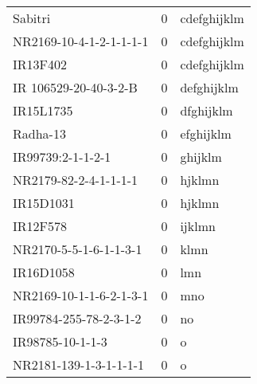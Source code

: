 \documentclass[]{article}
\begin{document}
\begin{longtable}{lll}
Sabitri & 0 & cdefghijklm\\
\rowcolor{gray!6}  NR2169-10-4-1-2-1-1-1-1 & 0 & cdefghijklm\\
IR13F402 & 0 & cdefghijklm\\
\addlinespace
\rowcolor{gray!6}  IR 106529-20-40-3-2-B & 0 & defghijklm\\
IR15L1735 & 0 & dfghijklm\\
\rowcolor{gray!6}  Radha-13 & 0 & efghijklm\\
IR99739:2-1-1-2-1 & 0 & ghijklm\\
\rowcolor{gray!6}  NR2179-82-2-4-1-1-1-1 & 0 & hjklmn\\
\addlinespace
IR15D1031 & 0 & hjklmn\\
\rowcolor{gray!6}  IR12F578 & 0 & ijklmn\\
NR2170-5-5-1-6-1-1-3-1 & 0 & klmn\\
\rowcolor{gray!6}  IR16D1058 & 0 & lmn\\
NR2169-10-1-1-6-2-1-3-1 & 0 & mno\\
\addlinespace
\rowcolor{gray!6}  IR99784-255-78-2-3-1-2 & 0 & no\\
IR98785-10-1-1-3 & 0 & o\\
\rowcolor{gray!6}  NR2181-139-1-3-1-1-1-1 & 0 & o\\
\bottomrule
\end{longtable}
\endgroup{}
\begingroup\fontsize{12}{14}\selectfont
\end{document}
